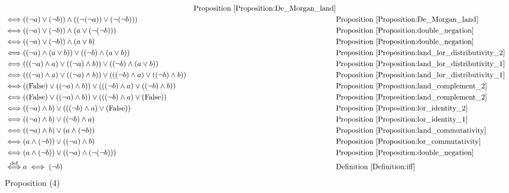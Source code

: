 \begin{prop}
\begin{align*}
& & \text{Proposition \ref{Proposition:De_Morgan_land}} \\
\iff & ((\lnot a) \lor (\lnot b)) \land ((\lnot (\lnot a)) \lor (\lnot (\lnot b)))
& & \text{Proposition \ref{Proposition:De_Morgan_land}} \\
\iff & ((\lnot a) \lor (\lnot b)) \land (a \lor (\lnot (\lnot b)))
& & \text{Proposition \ref{Proposition:double_negation}} \\
\iff & ((\lnot a) \lor (\lnot b)) \land (a \lor b)
& & \text{Proposition \ref{Proposition:double_negation}} \\
\iff & ((\lnot a) \land (a \lor b)) \lor ((\lnot b) \land (a \lor b))
& & \text{Proposition \ref{Proposition:land_lor_distributivity_2}} \\
\iff & (((\lnot a) \land a) \lor ((\lnot a) \land b)) \lor ((\lnot b) \land (a \lor b))
& & \text{Proposition \ref{Proposition:land_lor_distributivity_1}} \\
\iff & (((\lnot a) \land a) \lor ((\lnot a) \land b)) \lor (((\lnot b) \land a) \lor ((\lnot b) \land b))
& & \text{Proposition \ref{Proposition:land_lor_distributivity_1}} \\
\iff & ((\text{False}) \lor ((\lnot a) \land b)) \lor (((\lnot b) \land a) \lor ((\lnot b) \land b))
& & \text{Proposition \ref{Proposition:land_complement_2}} \\
\iff & ((\text{False}) \lor ((\lnot a) \land b)) \lor (((\lnot b) \land a) \lor (\text{False}))
& & \text{Proposition \ref{Proposition:land_complement_2}} \\
\iff & ((\lnot a) \land b) \lor (((\lnot b) \land a) \lor (\text{False}))
& & \text{Proposition \ref{Proposition:lor_identity_2}} \\
\iff & ((\lnot a) \land b) \lor ((\lnot b) \land a)
& & \text{Proposition \ref{Proposition:lor_identity_1}} \\
\iff & ((\lnot a) \land b) \lor (a \land (\lnot b))
& & \text{Proposition \ref{Proposition:land_commutativity}} \\
\iff & (a \land (\lnot b)) \lor ((\lnot a) \land b)
& & \text{Proposition \ref{Proposition:lor_commutativity}} \\
\iff & (a \land (\lnot b)) \lor ((\lnot a) \land (\lnot (\lnot b)))
& & \text{Proposition \ref{Proposition:double_negation}} \\
\overset{\operatorname{def}}{\iff} & a \iff (\lnot b)
& & \text{Definition \ref{Definition:iff}} \\
\end{align*}
Proposition (4)

\end{prop}
